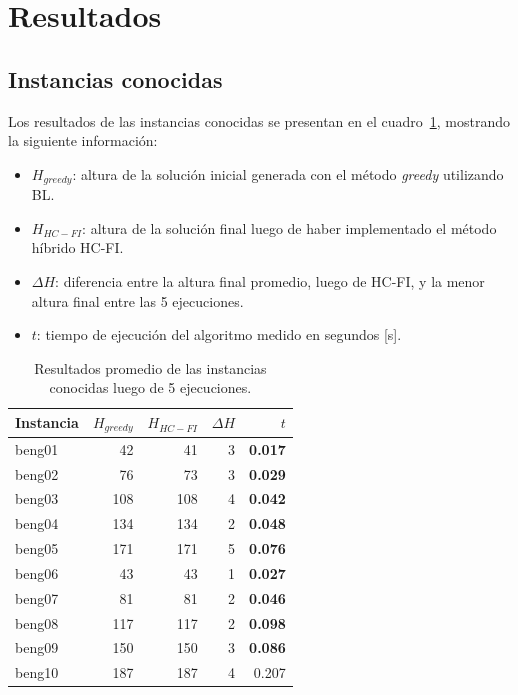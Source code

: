 \documentclass[letter, 10pt]{article}
\begin{document}
\section{Resultados}

\subsection{Instancias conocidas}

Los resultados de las instancias conocidas se presentan en el cuadro~\ref{tab:resultados_conocidas}, mostrando la siguiente informaci\'on:
\begin{itemize}
    \item $H_{greedy}$: altura de la soluci\'on inicial generada con el m\'etodo \emph{greedy} utilizando BL.
    \item $H_{HC-FI}$: altura de la soluci\'on final luego de haber implementado el m\'etodo h\'ibrido HC-FI.
    \item $\Delta H$: diferencia entre la altura final promedio, luego de HC-FI, y la menor altura final entre las 5 ejecuciones.
    \item $t$: tiempo de ejecuci\'on del algoritmo medido en segundos [s].
\end{itemize}

\begin{table}[H]
\centering
\begin{tabular}{|l|rrrr|}
\hline
Instancia & $H_{greedy}$ & $H_{HC-FI}$ & $\Delta H$ & $t$ \\ \hline
beng01 & 42 & 41 & 3 & \textbf{0.017} \\ \hline
beng02 & 76 & 73 & 3 & \textbf{0.029} \\ \hline
beng03 & 108 & 108 & 4 & \textbf{0.042} \\ \hline
beng04 & 134 & 134 & 2 & \textbf{0.048} \\ \hline
beng05 & 171 & 171 & 5 & \textbf{0.076} \\ \hline
beng06 & 43 & 43 & 1 & \textbf{0.027} \\ \hline
beng07 & 81 & 81 & 2 & \textbf{0.046} \\ \hline
beng08 & 117 & 117 & 2 & \textbf{0.098} \\ \hline
beng09 & 150 & 150 & 3 & \textbf{0.086} \\ \hline
beng10 & 187 & 187 & 4 & 0.207 \\ \hline
\end{tabular}
\caption{Resultados promedio de las instancias conocidas luego de 5 ejecuciones.}
\label{tab:resultados_conocidas}
\end{table}
\end{document}
